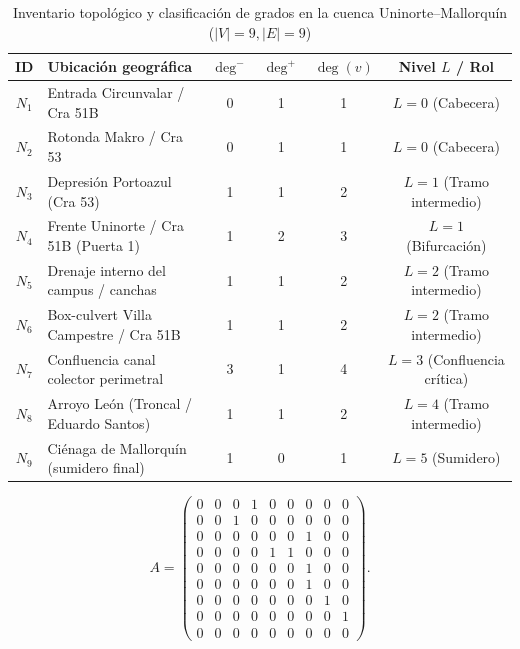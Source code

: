 \documentclass[12pt,letterpaper]{article}
\begin{document}
\begin{table}[H]
    \centering
    \singlespacing
    \small
    \caption{Inventario topológico y clasificación de grados en la cuenca Uninorte--Mallorquín ($|V|=9, |E|=9$)}
    \label{tab:nodos_cuenca}
    \begin{tabular}{@{}clcccc@{}}
        \toprule
        \textbf{ID} & \textbf{Ubicación geográfica} & $\deg^-$ & $\deg^+$ & $\deg(v)$ & \textbf{Nivel $L$ / Rol} \\
        \midrule
        $N_1$ & Entrada Circunvalar / Cra 51B          & 0 & 1 & 1 & $L=0$ (Cabecera) \\
        $N_2$ & Rotonda Makro / Cra 53                 & 0 & 1 & 1 & $L=0$ (Cabecera) \\
        $N_3$ & Depresión Portoazul (Cra 53)           & 1 & 1 & 2 & $L=1$ (Tramo intermedio) \\
        $N_4$ & Frente Uninorte / Cra 51B (Puerta 1)   & 1 & 2 & 3 & $L=1$ (Bifurcación) \\
        $N_5$ & Drenaje interno del campus / canchas   & 1 & 1 & 2 & $L=2$ (Tramo intermedio) \\
        $N_6$ & Box-culvert Villa Campestre / Cra 51B  & 1 & 1 & 2 & $L=2$ (Tramo intermedio) \\
        $N_7$ & Confluencia canal colector perimetral  & 3 & 1 & 4 & $L=3$ (Confluencia crítica) \\
        $N_8$ & Arroyo León (Troncal / Eduardo Santos) & 1 & 1 & 2 & $L=4$ (Tramo intermedio) \\
        $N_9$ & Ciénaga de Mallorquín (sumidero final) & 1 & 0 & 1 & $L=5$ (Sumidero) \\
        \bottomrule
    \end{tabular}
\end{table}

\begin{equation}
\label{eq:matriz_adj}
A =
\begin{pmatrix}
0 & 0 & 0 & 1 & 0 & 0 & 0 & 0 & 0 \\
0 & 0 & 1 & 0 & 0 & 0 & 0 & 0 & 0 \\
0 & 0 & 0 & 0 & 0 & 0 & 1 & 0 & 0 \\
0 & 0 & 0 & 0 & 1 & 1 & 0 & 0 & 0 \\
0 & 0 & 0 & 0 & 0 & 0 & 1 & 0 & 0 \\
0 & 0 & 0 & 0 & 0 & 0 & 1 & 0 & 0 \\
0 & 0 & 0 & 0 & 0 & 0 & 0 & 1 & 0 \\
0 & 0 & 0 & 0 & 0 & 0 & 0 & 0 & 1 \\
0 & 0 & 0 & 0 & 0 & 0 & 0 & 0 & 0
\end{pmatrix}.
\end{equation}
\end{document}
